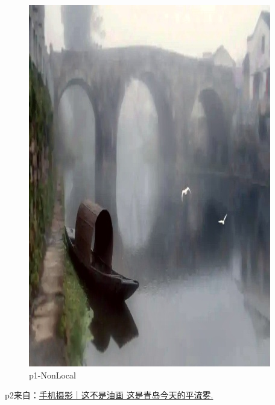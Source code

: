 \documentclass[12pt]{article}
\begin{document}
\begin{figure}[!h]
\begin{minipage}[t]{0.24\linewidth}
        \includegraphics[width=0.9\linewidth]{sample_pictures/after_p1_NonLocal.jpg}
        \caption*{p1-NonLocal}
    \end{minipage}
 \end{figure}\par
 p2来自：\href{https://mbd.baidu.com/newspage/data/dtlandingsuper?nid=dt_4509732377873248581}{手机摄影｜这不是油画 这是青岛今天的平流雾.}
\end{document}
